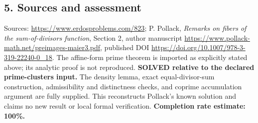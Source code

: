 \subsection*{5. Sources and assessment}
Sources: \url{https://www.erdosproblems.com/823}; P. Pollack, \emph{Remarks on fibers of the sum-of-divisors function}, Section 2, author manuscript \url{https://www.pollack-math.net/preimages-maier3.pdf}, published DOI \url{https://doi.org/10.1007/978-3-319-22240-0_18}. The affine-form prime theorem is imported as explicitly stated above; its analytic proof is not reproduced.
\textbf{SOLVED relative to the declared prime-clusters input.} The density lemma, exact equal-divisor-sum construction, admissibility and distinctness checks, and coprime accumulation argument are fully supplied. This reconstructs Pollack's known solution and claims no new result or local formal verification.
\textbf{Completion rate estimate: 100\%.}
